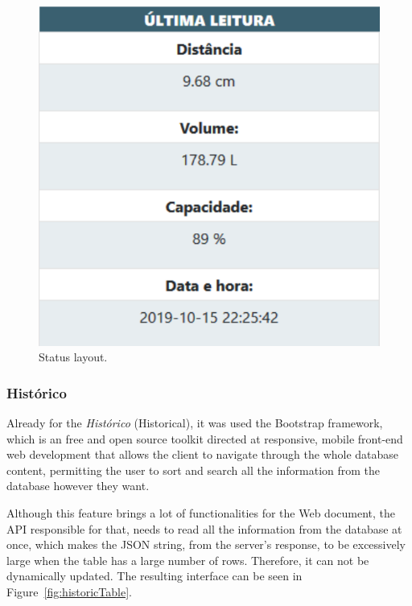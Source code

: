 \begin{figure}[h!]
    \centering
    \includegraphics[scale=0.65]{images/Development/web_database/status1.pdf}
    \caption{Status layout.}
    \label{fig:statusLayout}
\end{figure}


\subsubsection{Histórico}

Already for the \textit{Histórico} (Historical), it was used the Bootstrap framework, which is an free and open source toolkit directed at responsive, mobile front-end web development that allows the client to navigate through the whole database content, permitting the user to sort and search all the information from the database however they want. 

Although this feature brings a lot of functionalities for the Web document, the \gls{API} responsible for that, needs to read all the information from the database at once, which makes the \gls{JSON} string, from the server's response, to be excessively large when the table has a large number of rows. Therefore, it can not be dynamically updated. The resulting interface can be seen in Figure~\ref{fig:historicTable}.

